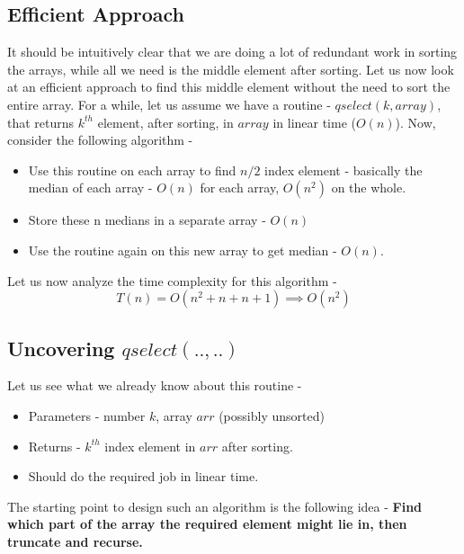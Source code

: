 \documentclass[journal,12pt,twocolumn]{IEEEtran}
\begin{document}
\subsection{Efficient Approach}
It should be intuitively clear that we are doing a lot of redundant work in sorting the arrays, while all we need is the middle element after sorting. Let us now look at an efficient approach to find this middle element without the need to sort the entire array. For a while, let us assume we have a routine - $qselect(k, array)$, that returns $k^{th}$ element, after sorting, in $array$ in linear time ($O(n)$).
Now, consider the following algorithm - 
    \begin{itemize}
        \item Use this routine on each array to find $n/2$ index element - basically the median of each array - $O(n)$ for each array, $O(n^{2})$ on the whole.
        \item Store these n medians in a separate array - $O(n)$
        \item Use the routine again on this new array to get median -  $O(n)$.
    \end{itemize} 


Let us now analyze the time complexity for this algorithm - 
\newline
    \begin{equation}
        T(n)  = O(n^{2} + n + n + 1) \label{eq:runtime_eff}
        \implies O(n^{2})
    \end{equation}
    

\subsection{Uncovering $qselect(.. , ..)$}

Let us see what we already know about this routine - 
    \begin{itemize}
        \item Parameters - number $k$, array $arr$ (possibly unsorted)
        \item Returns - $k^{th}$ index element in $arr$ after sorting.
        \item Should do the required job in linear time.
    \end{itemize}
    
The starting point to design such an algorithm is the following idea  - 
\newline
\textbf{Find which part of the array the required element might lie in, then truncate and recurse.
}
\end{document}
